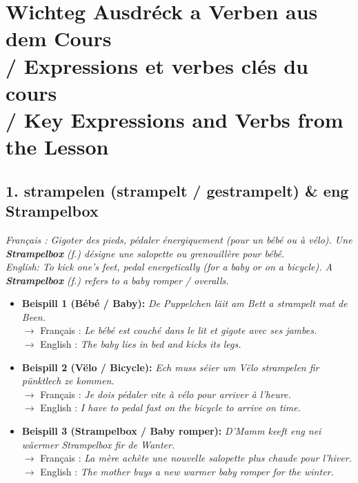 \vspace{1.5em}

\section[Wichteg Ausdréck a Verben / Key Verbs \& Expressions]{Wichteg Ausdréck a Verben aus dem Cours \\/ Expressions et verbes clés du cours \\/ Key Expressions and Verbs from the Lesson}

\subsection*{1. strampelen (strampelt / gestrampelt) \& eng Strampelbox}

\noindent\textit{Français : Gigoter des pieds, pédaler énergiquement (pour un bébé ou à vélo). Une \textbf{Strampelbox} (f.) désigne une salopette ou grenouillère pour bébé.}\\
\textit{English: To kick one's feet, pedal energetically (for a baby or on a bicycle). A \textbf{Strampelbox} (f.) refers to a baby romper / overalls.}

\begin{itemize}
    \item \textbf{Beispill 1 (Bébé / Baby):} \textit{De Puppelchen läit am Bett a strampelt mat de Been.}\\
    $\rightarrow$ Français : \textit{Le bébé est couché dans le lit et gigote avec ses jambes.}\\
    $\rightarrow$ English : \textit{The baby lies in bed and kicks its legs.}
    
    \item \textbf{Beispill 2 (Vëlo / Bicycle):} \textit{Ech muss séier um Vëlo strampelen fir pünktlech ze kommen.}\\
    $\rightarrow$ Français : \textit{Je dois pédaler vite à vélo pour arriver à l'heure.}\\
    $\rightarrow$ English : \textit{I have to pedal fast on the bicycle to arrive on time.}
    
    \item \textbf{Beispill 3 (Strampelbox / Baby romper):} \textit{D'Mamm keeft eng nei wäermer Strampelbox fir de Wanter.}\\
    $\rightarrow$ Français : \textit{La mère achète une nouvelle salopette plus chaude pour l'hiver.}\\
    $\rightarrow$ English : \textit{The mother buys a new warmer baby romper for the winter.}
\end{itemize}

